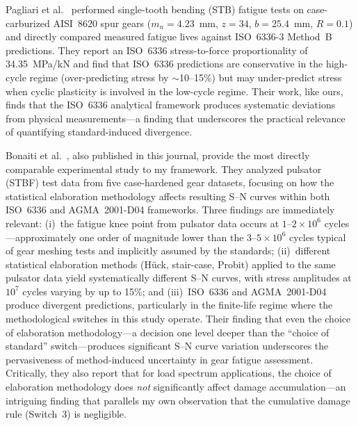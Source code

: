 \documentclass[12pt,a4paper]{article}
\begin{document}
Pagliari et al.~\cite{pagliari2025} performed single-tooth bending (STB)
fatigue tests on case-carburized AISI~8620 spur gears
($m_n{=}4.23$~mm, $z{=}34$, $b{=}25.4$~mm, $R{=}0.1$) and directly
compared measured fatigue lives against ISO~6336-3 Method~B predictions.
They report an ISO~6336 stress-to-force proportionality of
34.35~MPa/kN and find that ISO~6336 predictions are conservative in the
high-cycle regime (over-predicting stress by $\sim$10--15\%) but may
under-predict stress when cyclic plasticity is involved in the low-cycle
regime. Their work, like ours, finds that the ISO~6336 analytical
framework produces systematic deviations from physical measurements---a
finding that underscores the practical relevance of quantifying
standard-induced divergence.

Bonaiti et al.~\cite{bonaiti2024}, also published in this journal,
provide the most directly comparable experimental study to my framework.
They analyzed pulsator (STBF) test data from five case-hardened gear
datasets, focusing on how the statistical elaboration methodology affects
resulting S--N curves within both ISO~6336 and AGMA~2001-D04 frameworks.
Three findings are immediately relevant: (i)~the fatigue knee point from
pulsator data occurs at $1$--$2\times10^6$ cycles---approximately one
order of magnitude lower than the $3$--$5\times10^6$ cycles typical of
gear meshing tests and implicitly assumed by the standards; (ii)~different
statistical elaboration methods (H\"uck, stair-case, Probit) applied to
the same pulsator data yield systematically different S--N curves, with
stress amplitudes at $10^7$ cycles varying by up to 15\%; and
(iii)~ISO~6336 and AGMA~2001-D04 produce divergent predictions,
particularly in the finite-life regime where the methodological switches
in this study operate. Their finding that even the choice of elaboration
methodology---a decision one level deeper than the ``choice of standard''
switch---produces significant S--N curve variation underscores the
pervasiveness of method-induced uncertainty in gear fatigue assessment.
Critically, they also report that for load spectrum applications, the
choice of elaboration methodology does \emph{not} significantly affect
damage accumulation---an intriguing finding that parallels my own
observation that the cumulative damage rule (Switch~3) is negligible.
\end{document}
